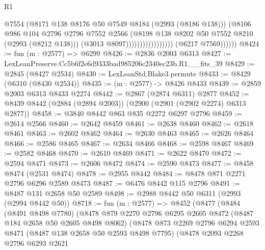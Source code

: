 \begin{lexlean}{R1}
\begin{coremodule}
                                            @7554
                                            (@8171 @138 @8176 @50 @7549 @8184 (@2993 (@8186 @138)))
                                            (@8106
                                              @986
                                              @104
                                              @2796
                                              @2796
                                              @7552
                                              @2566
                                              (@8198
                                                @138
                                                @8202
                                                @50
                                                @7552
                                                @8210
                                                (@2993 (@8212 @138)))
                                              (@3013 @8097)))))))))))))))))
              (@6217 @7569))))))
@8424 := fun (m : @2577) => @6299
@8426 := @2836 @2003 @6313
@8427 := LexLeanPreserve.Cc5b6f2e6d9333bad985206c2340ec23b.R1.__fits_39
@8429 := @2845 (@8427 @2534)
@8430 := LexLeanStd.Blake3.permute
@8433 := @8429 (@6310 (@8430 @2534))
@8435 := (m : @2577) -> @8426 @8433
@8439 := @2859 @2003 @6313 @8433 @2274
@8442 := @2867 (@2874 @6311) @2877
@8452 := @8439 @8442 (@2884 (@2894 @2003)) (@2900 (@2901 (@2902 @2274) @6313 @2877))
@8458 := @3840 @8442 @863 @835 @2272 @6297 @2796
@8459 := @2614 @2566
@8460 := @2642 @8459
@8461 := @2638 @8460
@8462 := @2618 @8461
@8463 := @2602 @8462
@8464 := @2630 @8463
@8465 := @2626 @8464
@8466 := @2586 @8465
@8467 := @2634 @8466
@8468 := @2598 @8467
@8469 := @2582 @8468
@8470 := @2610 @8469
@8471 := @2622 @8470
@8472 := @2594 @8471
@8473 := @2606 @8472
@8474 := @2590 @8473
@8477 := @8458 @8474 (@2531 @8474)
@8478 := @2955 @8442
@8484 := @8478 @871 @2271 @2796 @6296 @2589 @8473
@8487 := @6476 @8442 @115 @2796
@8491 := @8487 @131 @2658 @50 @2589
@8498 := @2988 @8442 @50 @6311 (@2993 (@2994 @8442 @50))
@8718 := fun (m : @2577) =>
  @8452
    (@8477
      (@8484
        (@8491 @8498 @7780)
        (@8478
          @879
          @2270
          @2796
          @6295
          @2605
          @8472
          (@8487 @184 @2658 @50 @2605 @8498 @8062)
          (@8478
            @873
            @2269
            @2796
            @6294
            @2593
            @8471
            (@8487 @138 @2658 @50 @2593 @8498 @7795)
            (@8478
              @2093
              @2268
              @2796
              @6293
              @2621

\end{coremodule}
\end{lexlean}

